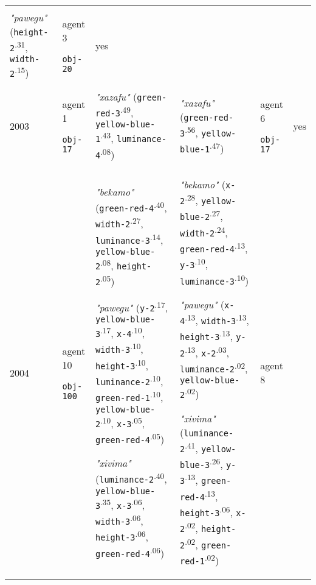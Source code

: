{\begin{tabular}{@{}p{0.4cm}p{0.85cm}p{6.5cm}p{6.5cm}p{0.85cm}p{0.5cm}@{}}
\textit{"pawegu"} (\texttt{height-2}\textsuperscript{.31}, \texttt{width-2}\textsuperscript{.15}) & agent 3 

 \texttt{obj-20} & yes \\
2003 & agent 1 

\texttt{obj-17} &\textit{"xazafu"} (\texttt{green-red-3}\textsuperscript{.49}, \texttt{yellow-blue-1}\textsuperscript{.43}, \texttt{luminance-4}\textsuperscript{.08}) & \textit{"xazafu"} (\texttt{green-red-3}\textsuperscript{.56}, \texttt{yellow-blue-1}\textsuperscript{.47}) & agent 6 

 \texttt{obj-17} & yes \\
2004 & agent 10 

\texttt{obj-100} &\textit{"bekamo"} (\texttt{green-red-4}\textsuperscript{.40}, \texttt{width-2}\textsuperscript{.27}, \texttt{luminance-3}\textsuperscript{.14}, \texttt{yellow-blue-2}\textsuperscript{.08}, \texttt{height-2}\textsuperscript{.05})

\textit{"pawegu"} (\texttt{y-2}\textsuperscript{.17}, \texttt{yellow-blue-3}\textsuperscript{.17}, \texttt{x-4}\textsuperscript{.10}, \texttt{width-3}\textsuperscript{.10}, \texttt{height-3}\textsuperscript{.10}, \texttt{luminance-2}\textsuperscript{.10}, \texttt{green-red-1}\textsuperscript{.10}, \texttt{yellow-blue-2}\textsuperscript{.10}, \texttt{x-3}\textsuperscript{.05}, \texttt{green-red-4}\textsuperscript{.05})

\textit{"xivima"} (\texttt{luminance-2}\textsuperscript{.40}, \texttt{yellow-blue-3}\textsuperscript{.35}, \texttt{x-3}\textsuperscript{.06}, \texttt{width-3}\textsuperscript{.06}, \texttt{height-3}\textsuperscript{.06}, \texttt{green-red-4}\textsuperscript{.06}) & \textit{"bekamo"} (\texttt{x-2}\textsuperscript{.28}, \texttt{yellow-blue-2}\textsuperscript{.27}, \texttt{width-2}\textsuperscript{.24}, \texttt{green-red-4}\textsuperscript{.13}, \texttt{y-3}\textsuperscript{.10}, \texttt{luminance-3}\textsuperscript{.10})

\textit{"pawegu"} (\texttt{x-4}\textsuperscript{.13}, \texttt{width-3}\textsuperscript{.13}, \texttt{height-3}\textsuperscript{.13}, \texttt{y-2}\textsuperscript{.13}, \texttt{x-2}\textsuperscript{.03}, \texttt{luminance-2}\textsuperscript{.02}, \texttt{yellow-blue-2}\textsuperscript{.02})

\textit{"xivima"} (\texttt{luminance-2}\textsuperscript{.41}, \texttt{yellow-blue-3}\textsuperscript{.26}, \texttt{y-3}\textsuperscript{.13}, \texttt{green-red-4}\textsuperscript{.13}, \texttt{height-3}\textsuperscript{.06}, \texttt{x-2}\textsuperscript{.02}, \texttt{height-2}\textsuperscript{.02}, \texttt{green-red-1}\textsuperscript{.02}) & agent 8 


\end{tabular}}
